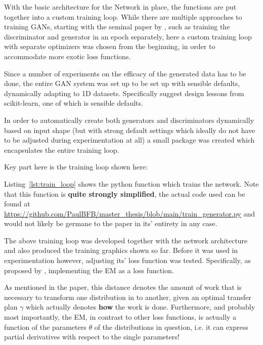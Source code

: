 With the basic architecture for the Network in place, the functions are put together into a custom training loop. While there are multiple approaches to training \acp{GAN}, starting with the seminal paper by \cite{goodfellow2014generative}, such as training the discriminator and generator in an epoch separately, here a custom training loop with separate optimizers was chosen from the beginning, in order to accommodate more exotic loss functions.

Since a number of experiments on the efficacy of the generated data has to be done, the entire \ac{GAN} system was set up to be set up with sensible defaults, dynamically adapting to 1D datasets. 
Specifically \cite{buitinck2013api} suggest design lessons from scikit-learn, one of which is sensible defaults.

In order to automatically create both generators and discriminators dynamically based on input shape (but with strong default settings which ideally do not have to be adjusted during experimentation at all) a small package was created which encapsulates the entire training loop.

Key part here is the training loop shown here:

\newpage



Listing~\ref{lst:train_loop} shows the python function which trains the network. Note that this function is \textbf{quite strongly simplified}, 
the actual code used can be found at \url{https://github.com/PaulBFB/master_thesis/blob/main/train_generator.py} and would not likely be germane to the paper in its' entirety in any case.

\pagebreak

The above training loop was developed together with the network architecture and also produced the training graphics shown so far. Before it was used in experimentation however, adjusting its' loss function was tested.
Specifically, as proposed by \cite{arjovsky2017wasserstein}, implementing the \ac{EM} as a loss function. 


As mentioned in the paper, this distance denotes the amount of work that is necessary to transform one distribution in to another, given an optimal transfer plan $\gamma$ which actually denotes \textbf{how} the work is done.
Furthermore, and probably most importantly, the \ac{EM}, in contrast to other loss functions, is actually a function of the parameters $\theta$ of the distributions in question, i.e. it can express partial derivatives with respect to the single parameters!

